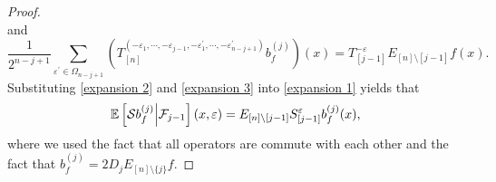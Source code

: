 \documentclass{amsart}
\numberwithin{equation}{section}
\begin{document}
\begin{proof}
\begin{equation}
\end{equation}
and
\begin{equation}\label{expansion 3}
\frac{1}{2^{n-j+1}}\sum_{\varepsilon^{\prime}\in \Omega_{n-j+1}}\left(T^{(-\varepsilon_{1},\cdots, -\varepsilon_{j-1},-\varepsilon^{\prime}_{1},\cdots, -\varepsilon^{\prime}_{n-j+1})}_{[n]}b^{(j)}_{f}\right)(x)=T^{-\varepsilon}_{[j-1]}E_{[n]\setminus[j-1]}f(x).
\end{equation}
Substituting \eqref{expansion 2} and \eqref{expansion 3} into \eqref{expansion 1} yields that
\[
\mathbb{E}\left[\mathcal{S}b^{(j)}_{f}\Big{|}\mathcal{F}_{j-1}\right](x,\varepsilon)=E_{[n]\setminus[j-1]}S^{\varepsilon}_{[j-1]}b^{(j)}_{f}(x),
\]
where we used the fact that all operators are commute with each other and the fact that $b^{(j)}_{f}=2D_{j}E_{[n]\setminus\{j\}}f$.
\end{proof}
\end{document}
